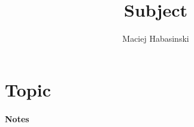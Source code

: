 \documentclass[a4paper, 10pt]{article}
\title{\center Subject }
\author{Maciej Habasinski}
\begin{document}
\maketitle

\section{Topic}

\paragraph{Notes}
\end{document}
